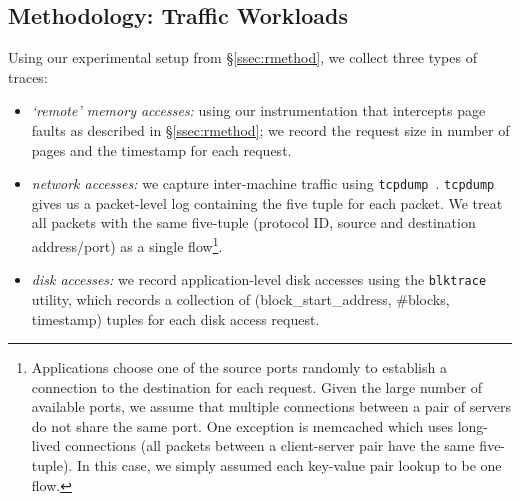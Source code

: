 \subsection{Methodology: \dis Traffic Workloads}
\label{ssec:ssmethod-traffic}

Using our experimental setup from \S\ref{ssec:rmethod},%
we collect three types of traces: 
\begin{itemize}
\item \emph{`remote' memory accesses:} using our instrumentation that intercepts 
page faults as described in \S\ref{ssec:rmethod}; we record the 
request size in number of pages and the timestamp for each request.
\item \emph{network accesses:} we capture inter-machine traffic using {\tt tcpdump}~\cite{tcpdump}. {\tt tcpdump} gives us a packet-level log containing the five tuple for each packet. We treat all packets with the same five-tuple (protocol ID, source and destination address/port) as a single flow{\footnote{Applications choose one of the source ports randomly to establish a connection to the destination for each request. Given the large number of available ports, we assume that multiple connections between a pair of servers do not share the same port.  
One exception is memcached which uses long-lived connections (all packets between a client-server pair have the same five-tuple). In this case, we simply assumed each key-value pair lookup to be one flow.}}.
\item \emph{disk accesses:} we record application-level disk accesses using the {\tt blktrace} utility, which records a collection of (block\_start\_address, \#blocks, timestamp) tuples for each disk access request. 
\end{itemize} 

